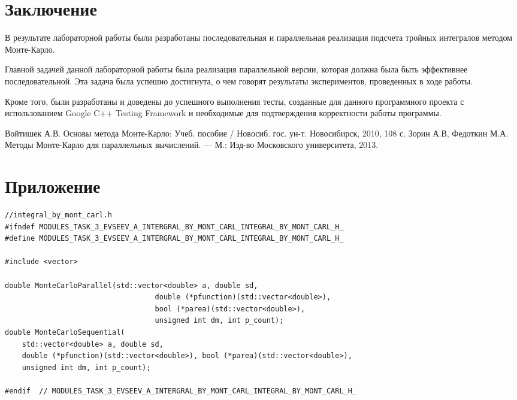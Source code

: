 \documentclass{report}
\begin{document}
\section*{Заключение}
В результате лабораторной работы были разработаны последовательная и параллельная реализация подсчета тройных интегралов методом Монте-Карло.
\par Главной задачей данной лабораторной работы была реализация параллельной версии, которая должна была быть эффективнее последовательной. Эта задача была успешно достигнута, о чем говорят результаты экспериментов, проведенных в ходе работы.
\par Кроме того, были разработаны и доведены до успешного выполнения тесты, созданные для данного программного проекта с использованием Google C++ Testing Framework и необходимые для подтверждения корректности работы программы.
\newpage

\begin{thebibliography}{1}
 Войтишек А.В. Основы метода Монте-Карло: Учеб. пособие / Новосиб. гос. ун-т. Новосибирск, 2010, 108 с. 
 Зорин А.В, Федоткин М.А. Методы Монте-Карло для параллельных вычислений. — М.: Изд-во Московского университета, 2013.
\end{thebibliography}
\newpage

\section*{Приложение}


\begin{lstlisting}
//integral_by_mont_carl.h
#ifndef MODULES_TASK_3_EVSEEV_A_INTERGRAL_BY_MONT_CARL_INTEGRAL_BY_MONT_CARL_H_
#define MODULES_TASK_3_EVSEEV_A_INTERGRAL_BY_MONT_CARL_INTEGRAL_BY_MONT_CARL_H_

#include <vector>

double MonteCarloParallel(std::vector<double> a, double sd,
                                   double (*pfunction)(std::vector<double>),
                                   bool (*parea)(std::vector<double>),
                                   unsigned int dm, int p_count);
double MonteCarloSequential(
    std::vector<double> a, double sd,
    double (*pfunction)(std::vector<double>), bool (*parea)(std::vector<double>),
    unsigned int dm, int p_count);

#endif  // MODULES_TASK_3_EVSEEV_A_INTERGRAL_BY_MONT_CARL_INTEGRAL_BY_MONT_CARL_H_
\end{lstlisting}
\end{document}
